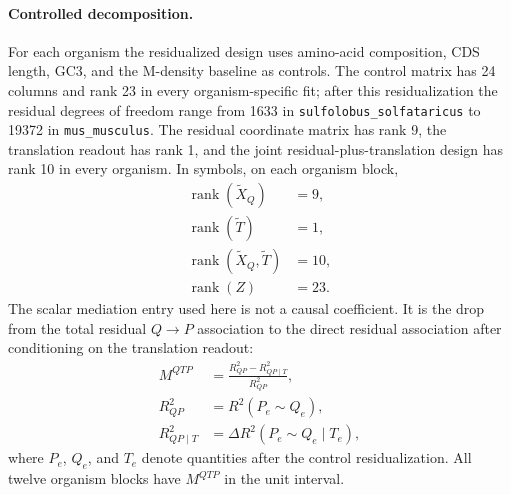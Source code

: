 \paragraph{Controlled decomposition.}
For each organism the residualized design uses amino-acid composition, CDS length, GC3, and the M-density baseline as controls.  The control matrix has 24 columns and rank 23 in every organism-specific fit; after this residualization the residual degrees of freedom range from 1633 in \texttt{sulfolobus\_solfataricus} to 19372 in \texttt{mus\_musculus}.  The residual coordinate matrix has rank 9, the translation readout has rank 1, and the joint residual-plus-translation design has rank 10 in every organism.  In symbols, on each organism block,
$$\begin{aligned}
\operatorname{rank}(\widetilde X_Q) &= 9,\\
\operatorname{rank}(\widetilde T) &= 1,\\
\operatorname{rank}(\widetilde X_Q,\widetilde T) &= 10,\\
\operatorname{rank}(Z) &= 23.
\end{aligned}$$
The scalar mediation entry used here is not a causal coefficient.  It is the drop from the total residual $Q\to P$ association to the direct residual association after conditioning on the translation readout:
$$\begin{aligned}
M^{QTP} &= \frac{R^2_{QP}-R^2_{QP\mid T}}{R^2_{QP}},\\
R^2_{QP} &= R^2(P_e\sim Q_e),\\
R^2_{QP\mid T} &= \Delta R^2(P_e\sim Q_e\mid T_e),
\end{aligned}$$
where $P_e$, $Q_e$, and $T_e$ denote quantities after the control residualization.  All twelve organism blocks have $M^{QTP}$ in the unit interval.

